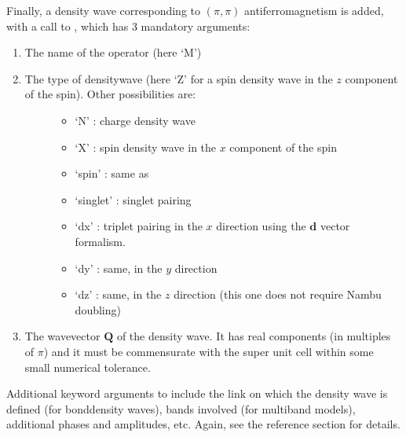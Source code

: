 \documentclass[letterpaper,10pt,english]{sphinxmanual}
\begin{document}
\sphinxAtStartPar
Finally, a density wave corresponding to \((\pi,\pi)\) antiferromagnetism is added, with a call to , which has 3 mandatory arguments:
\begin{enumerate}
%
\item {} 
\sphinxAtStartPar
The name of the operator (here ‘M’)

\item {} \begin{description}
\item[{The type of density\sphinxhyphen{}wave (here ‘Z’ for a spin density wave in the \(z\) component of the spin). Other possibilities are:}] \leavevmode\begin{itemize}
\item {} 
\sphinxAtStartPar
‘N’ : charge density wave

\item {} 
\sphinxAtStartPar
‘X’ : spin density wave in the \(x\) component of the spin

\item {} 
\sphinxAtStartPar
‘spin’ : same as 

\item {} 
\sphinxAtStartPar
‘singlet’ : singlet pairing

\item {} 
\sphinxAtStartPar
‘dx’ : triplet pairing in the \(x\) direction using the \(\mathbf{d}\) vector formalism.

\item {} 
\sphinxAtStartPar
‘dy’ : same, in the \(y\) direction

\item {} 
\sphinxAtStartPar
‘dz’ : same, in the \(z\) direction (this one does not require Nambu doubling)

\end{itemize}

\end{description}

\item {} 
\sphinxAtStartPar
The wavevector \(\mathbf{Q}\) of the density wave. It has real components (in multiples of \(\pi\)) and it must be commensurate with the super unit cell within some small numerical tolerance.

\end{enumerate}

\sphinxAtStartPar
Additional keyword arguments to  include the link on which the density wave is defined (for bond\sphinxhyphen{}density waves), bands involved (for multi\sphinxhyphen{}band models), additional phases and amplitudes, etc. Again, see the reference section for details.
\end{document}
